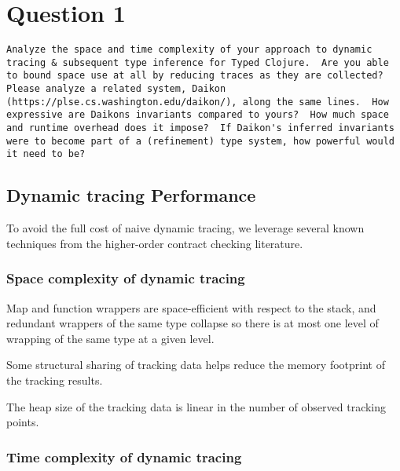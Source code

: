 \section{Question 1}

\begin{verbatim}
Analyze the space and time complexity of your approach to dynamic
tracing & subsequent type inference for Typed Clojure.  Are you able
to bound space use at all by reducing traces as they are collected?
Please analyze a related system, Daikon
(https://plse.cs.washington.edu/daikon/), along the same lines.  How
expressive are Daikons invariants compared to yours?  How much space
and runtime overhead does it impose?  If Daikon's inferred invariants
were to become part of a (refinement) type system, how powerful would
it need to be?
\end{verbatim}

\pagebreak

\subsection{Dynamic tracing Performance}

To avoid the full cost of naive dynamic tracing, we leverage several
known techniques from the higher-order contract checking literature.

\subsubsection{Space complexity of dynamic tracing}

Map and function wrappers are space-efficient with respect to the stack, and
redundant wrappers of the same type collapse so there is at most one level
of wrapping of the same type at a given level.

Some structural sharing of tracking data helps reduce the memory footprint
of the tracking results.

The heap size of the tracking data is linear in the number of observed
tracking points.

%

\subsubsection{Time complexity of dynamic tracing}

